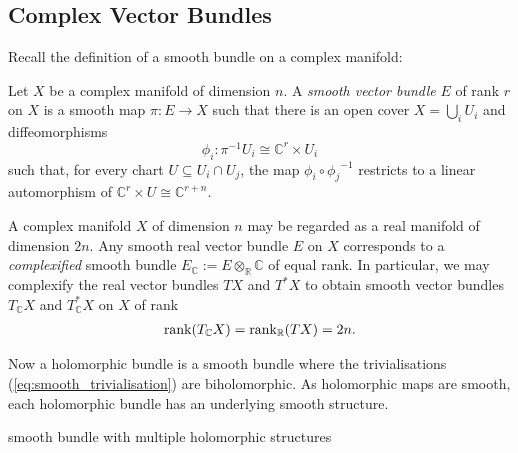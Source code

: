 \documentclass[12pt]{ociamthesis}  %
\begin{document}
\subsection{Complex Vector Bundles}

Recall the definition of a smooth bundle on a complex
manifold:

\begin{definition}
  Let $X$ be a complex manifold of dimension $n$. A
  \emph{smooth vector bundle} $E$ of rank $r$ on $X$ is a smooth map
  $\pi : E\to X$ such that there
  is an open cover $X = \bigcup_i U_i$ and diffeomorphisms
  \begin{equation}\label{eq:smooth_trivialisation}
    \phi_i : {\pi}^{-1}U_i \cong \mathbb{C}^r \times U_i
  \end{equation}
  such that, for every chart $U\subseteq U_i\cap U_j$, the
  map $\phi_i \circ {\phi_j}^{-1}$ restricts to a linear
  automorphism of $\mathbb{C}^r\times U \cong \mathbb{C}^{r+n}$.
\end{definition}

\begin{example}
  A complex manifold $X$ of dimension $n$ may be regarded as a
  real manifold of dimension $2n$. Any smooth real vector bundle
  $E$ on $X$ corresponds to a \emph{complexified} smooth bundle
  $E_{\mathbb{C}} := E\otimes_{\mathbb{R}} \mathbb{C}$ of equal rank.
  In particular, we may complexify the real vector bundles
  $TX$ and $T^*X$ to obtain smooth vector bundles
  $T_{\mathbb{C}} X$ and $T_{\mathbb{C}}^*X$
  on $X$ of rank
  \begin{align*}
    \operatorname{rank}(T_\mathbb{C} X)
    = \operatorname{rank}_{\mathbb{R}} (TX) = 2n.
  \end{align*}
\end{example}

Now a holomorphic bundle is a smooth bundle where the trivialisations
(\ref{eq:smooth_trivialisation}) are biholomorphic. As holomorphic
maps are smooth, each holomorphic bundle has an underlying smooth
structure.

\begin{example}
  smooth bundle with multiple holomorphic structures
  \missingexample
\end{example}
\end{document}
